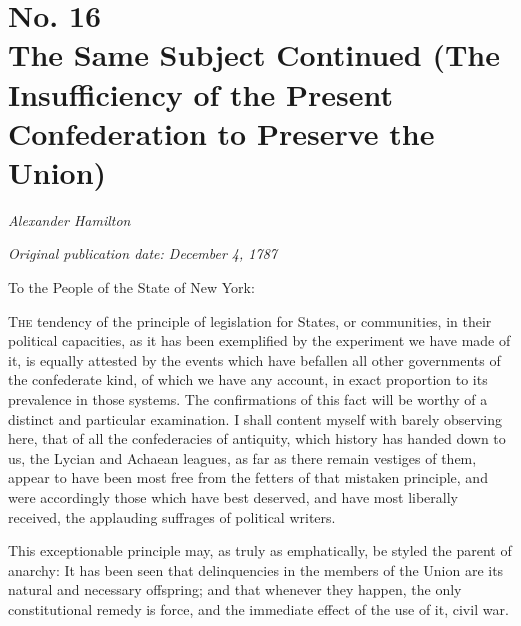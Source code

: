 \chapter[No. 16: The Same Subject Continued (The Insufficiency of the Present Confederation to Preserve the Union)]{No. 16\\ {\small The Same Subject Continued (The Insufficiency of the Present Confederation to Preserve the Union)}}

\textit{Alexander Hamilton}

\textit{Original publication date: December 4, 1787}
\vspace{1cm}

To the People of the State of New York:
\vspace{.4cm}

\textsc{The} tendency of the principle of legislation for States, or communities, in their political capacities, as it has been exemplified by the experiment we have made of it, is equally attested by the events which have befallen all other governments of the confederate kind, of which we have any account, in exact proportion to its prevalence in those systems. 
The confirmations of this fact will be worthy of a distinct and particular examination. 
I shall content myself with barely observing here, that of all the confederacies of antiquity, which history has handed down to us, the Lycian and Achaean leagues, as far as there remain vestiges of them, appear to have been most free from the fetters of that mistaken principle, and were accordingly those which have best deserved, and have most liberally received, the applauding suffrages of political writers.

This exceptionable principle may, as truly as emphatically, be styled the parent of anarchy: It has been seen that delinquencies in the members of the Union are its natural and necessary offspring; and that whenever they happen, the only constitutional remedy is force, and the immediate effect of the use of it, civil war.

